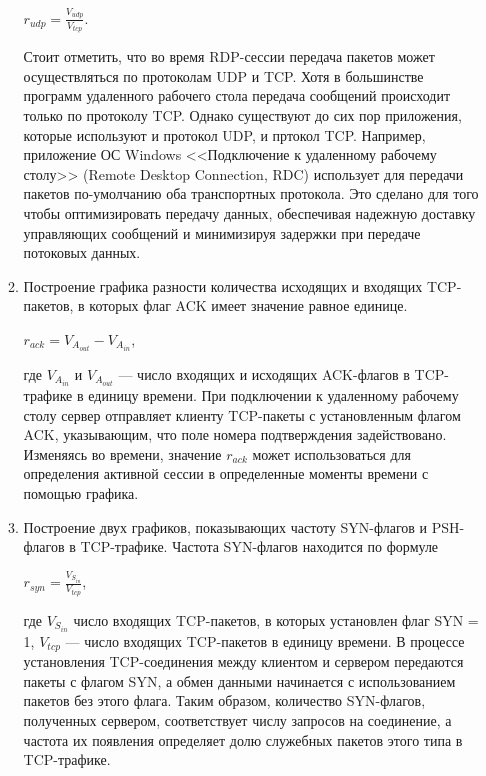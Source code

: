 \documentclass[bachelor, och, coursework]{SCWorks}
\begin{document}
\begin{enumerate}
\begin{enumerate}
    \begin{center}
      $r_{udp} = \frac{V_{udp}}{V_{tcp}}$.
    \end{center}

    Стоит отметить, что во время RDP-сессии передача пакетов может осуществляться по протоколам UDP и TCP. Хотя в большинстве программ удаленного
    рабочего стола передача сообщений происходит только по протоколу TCP. Однако существуют до сих пор приложения, которые используют и протокол
    UDP, и пртокол TCP. Например, приложение ОС Windows <<Подключение к удаленному рабочему столу>> (Remote Desktop Connection, RDC) использует для
    передачи пакетов по-умолчанию оба транспортных протокола. Это сделано для того чтобы оптимизировать передачу данных, обеспечивая надежную 
    доставку управляющих сообщений и минимизируя задержки при передаче потоковых данных.
    
    \item Построение графика разности количества исходящих и входящих TCP-пакетов, в которых флаг ACK имеет значение
    равное единице.

    \begin{center}
      $r_{ack} = V_{A_{out}} - V_{A_{in}}$,
    \end{center}

    где $V_{A_{in}}$ и $V_{A_{out}}$ --- число входящих и исходящих ACK-флагов в TCP-трафике в единицу времени. При подключении к удаленному рабочему 
    столу сервер отправляет клиенту TCP-пакеты с установленным флагом ACK, указывающим, что поле номера подтверждения задействовано. Изменяясь во времени, 
    значение $r_{ack}$ может использоваться для определения активной сессии в определенные моменты времени с помощью графика.

    \item Построение двух графиков, показывающих частоту SYN-флагов и PSH-флагов в TCP-трафике. Частота SYN-флагов находится по формуле
    
    \begin{center}
      $r_{syn} = \frac{V_{S_{in}}}{V_{tcp}}$,
    \end{center}

    где $V_{S_{in}}$ число входящих TCP-пакетов, в которых установлен флаг SYN = 1, $V_{tcp}$ --- число входящих TCP-пакетов в единицу времени.
    В процессе установления TCP-соединения между клиентом и сервером передаются пакеты с флагом SYN, а обмен данными начинается с 
    использованием пакетов без этого флага. Таким образом, количество SYN-флагов, полученных сервером, соответствует числу запросов 
    на соединение, а частота их появления определяет долю служебных пакетов этого типа в TCP-трафике.


\end{enumerate}
\end{enumerate}
\end{document}
